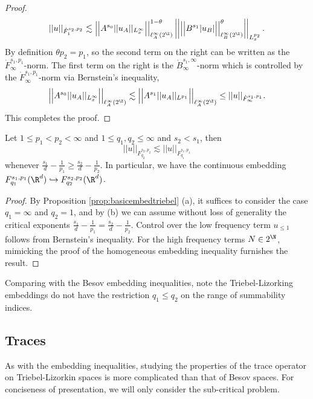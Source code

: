 \begin{proof}
		\[ ||u||_{\dot F^{s_2, p_2}_1} \lesssim  \Big|\Big| A^{s_0} ||u_A||_{L^\infty_x} \Big| \Big|_{\ell^\infty_A (2^\Z)}^{1 - \theta} \left|\left|\Big|\Big| B^{s_1} |u_B| \Big| \Big|_{\ell^\infty_B (2^\Z)}^\theta \right|\right|_{L^{p_2}_x}. \]
	By definition $\theta p_2 = p_1$, so the second term on the right can be written as the $\dot F^{s_1, p_1}_\infty$-norm. The first term on the right is the $\dot B^{s_1, \infty}_\infty$-norm which is controlled by the $\dot F^{s_1, p_1}_\infty$-norm via Bernstein's inequality, 
		\[  \Big|\Big| A^{s_0} ||u_A||_{L^\infty_x} \Big| \Big|_{\ell^\infty_A (2^\Z)} \lesssim  \Big|\Big| A^{s_1} ||u_A||_{L^{p_1}} \Big| \Big|_{\ell^\infty_A (2^\Z)} \leq ||u||_{\dot F^{s_1, p_1}_\infty}. \]	
	This completes the proof. 
\end{proof}		


\begin{theorem}
	Let $1 \leq p_1 < p_2 < \infty$ and $1 \leq q_1, q_2 \leq \infty$ and $s_2 < s_1$, then 
		\[ || u ||_{F^{s_2, p_2}_{q_2}} \lesssim || u ||_{F^{s_1, p_1}_{q_1}} \]
	whenever $\frac{s_1}{d} - \frac{1}{p_1} \geq \frac{s_2}{d} - \frac{1}{p_2}$. In particular, we have the continuous embedding $F^{s_1, p_1}_{q_1} (\R^d) \hookrightarrow F^{s_2, p_2}_{q_2} (\R^d)$.
\end{theorem}

\begin{proof}
	By Proposition \ref{prop:basicembedtriebel} (a), it suffices to consider the case $q_1 = \infty$ and $q_2 = 1$, and by (b) we can assume without loss of generality the critical exponents $\frac{s_1}{d} - \frac{1}{p_1} = \frac{s_2}{d} - \frac{1}{p_2}$. Control over the low frequency term $u_{\leq 1}$ follows from Bernstein's inequality. For the high frequency terms $N \in 2^\N$, mimicking the proof of the homogeneous embedding inequality furnishes the result. 
\end{proof}

\begin{remark}
	Comparing with the Besov embedding inequalities, note the Triebel-Lizorking embeddings do not have the restriction $q_1 \leq q_2$ on the range of summability indices. 
\end{remark}

\subsection{Traces}

As with the embedding inequalities, studying the properties of the trace operator on Triebel-Lizorkin spaces is more complicated than that of Besov spaces. For conciseness of presentation, we will only consider the sub-critical problem. 

